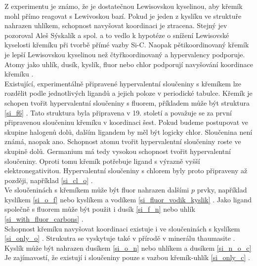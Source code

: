 \documentclass[
  digital, %
  table,   %
  lof,     %
  lot,     %
  oneside,
]{fithesis3}
\begin{document}
Z experimentu je známo, že  je dostatečnou Lewisovskou kyselinou, aby křemík mohl přímo reagovat s Lewivoskou bazí. Pokud je jeden z kyslíku ve struktuře nahrazen uhlíkem, schopnost navyšovat koordinaci je ztracena. Stejný jev pozoroval Aleš Sýskalík a spol. \cite{Styskalik2015thesis} a to vedlo k hypotéze o snížení Lewisovské kyselosti křemíku při tvorbě přímé vazby Si-C. Naopak pětikoordinovaný křemík je lepší Lewisovskou kyselinou než čtyřkoordinovaný a hypervalency podporuje. Atomy jako uhlík, dusík, kyslík, fluor nebo chlor podporují navyšování koordinace křemíku \cite{Wagler2014}.\\
Existující, experimentálně připravené hypervalentní sloučeniny s křemíkem lze rozdělit podle jednotlivých ligandů a jejich poloze v periodické tabulce. Křemík je schopen tvořit hypervalentní sloučeniny s fluorem, příkladem může být struktura   \ref{si_f6} \cite{memoriesphysiquelussac}. Tato struktura byla připravena v 19. století a považuje se za první připravenou sloučeninu křemíku v koordinaci šest. Pokud budeme postupovat ve skupine halogenů dolů, dalším ligandem by měl být logicky chlor. Sloučenina  není známá, naopak  ano. Schopnost atomu tvořit hypervalentní sloučeniny roste ve skupině dolů. Germanium má tedy vysokou schopnost tvořit hypervalentní sloučeniny. Oproti tomu křemík potřebuje ligand s výrazně vyšší elektronegativitou. Hypervalentní sloučeniny s chlorem byly proto připraveny až později, například \ref{si_cl_o} \cite{LAZAREV199716}.\\
Ve sloučeninách s křemíkem může být fluor nahrazen dalšími $p$ prvky, například kyslíkem \ref{si_o_f} \cite{C0DT01115K} nebo kyslíkem a vodíkem \ref{si_fluor_vodik_kyslik} \cite{BOYER19812165}.
Jako ligand společně s fluorem může být použit i dusík \ref{si_f_n}  \cite{C0DT01115K} nebo uhlík \ref{si_with_fluor_carbons} \cite{kremikfluorcarbon}.\\
Schopnost křemíku navyšovat koordinaci existuje i ve sloučeninách s kyslíkem \ref{si_only_o} \cite{flyn1969}. Strukutra  se vyskytuje také v přírodě v minerálu thaumasite \cite{Edge:a08100}. Kyslík může být nahrazen dusíkem  \ref{si_o_n} \cite{Wagler2014} nebo uhlíkem a dusíkem  \ref{si_n_o_c} \cite{Wagler2014}\\
Je zajímavostí, že existují i sloučeniny pouze s vazbou křemík-uhlík \ref{si_only_c} \cite{A901953G}\cite{Wagler2014}.
\end{document}
